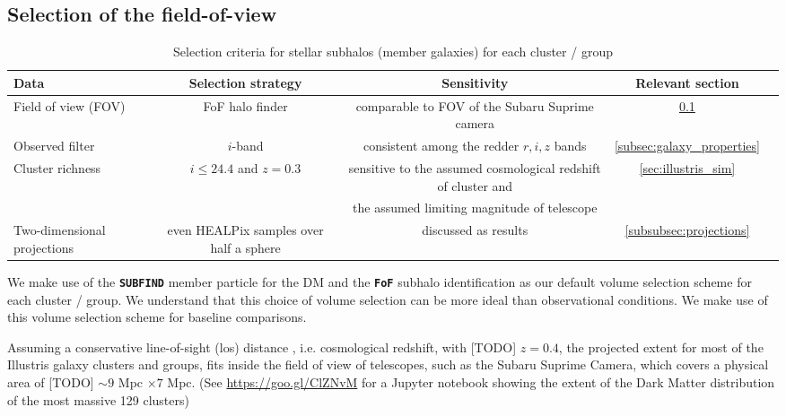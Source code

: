 \subsection{Selection of the field-of-view}
\label{sec:FOV}

\begin{table*}
\begin{center}
\begin{minipage}{180mm} 
	\caption{ Selection criteria for stellar subhalos (member galaxies) for each
		cluster / group 
\label{tab:member_galaxy_selections}} 
	\begin{tabular}{@{}lcccc@{}}
\hline 
Data &  Selection strategy  & Sensitivity & Relevant section  \\ \hline
Field of view (FOV) & FoF halo finder& comparable to FOV of the Subaru
Suprime camera & \ref{sec:FOV}  \\ 
Observed filter & $i$-band & consistent among the redder $r, i, z$ bands &   
\ref{subsec:galaxy_properties}
\\ 
Cluster richness  & $i \leq 24.4$ and $z = 0.3$  & sensitive to
the assumed cosmological redshift of cluster and & \ref{sec:illustris_sim} \\ 
& & the assumed limiting magnitude of telescope &   \\
Two-dimensional projections & even HEALPix samples over half a sphere &
discussed as results  & \ref{subsubsec:projections}\\  
\hline
\end{tabular} 
\label{tab:selection_criteria} 
\footnotesize{
}
\end{minipage}
\end{center} 
\end{table*}

We make use of the {\bf \texttt{SUBFIND}} member particle for the DM and the 
{\bf \texttt{FoF}} subhalo identification as our
default volume selection scheme for each cluster / group.
We understand that this choice of volume selection can be more ideal than
observational conditions. We make use of this volume selection scheme
for baseline comparisons. 

Assuming a conservative line-of-sight (los) distance 
, i.e. cosmological redshift, with [TODO] $z = 0.4$, 
the projected extent for most of the Illustris galaxy clusters and groups, 
fits inside the field of view of telescopes, such as the Subaru Suprime Camera,
which covers a physical area of [TODO] $\sim 9$ Mpc $\times 7$ Mpc. 
(See \href{https://goo.gl/ClZNvM}{https://goo.gl/ClZNvM} for a Jupyter notebook 
showing the extent of the Dark Matter distribution of the most massive 129 clusters)

